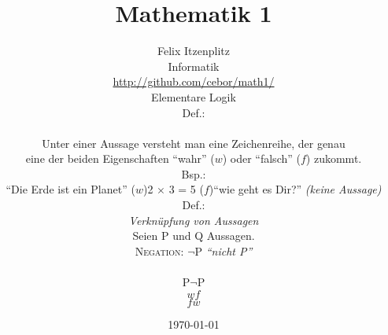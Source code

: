 \documentclass[11pt,a4paper,oneside]{article}
\begin{document}
\title{Mathematik 1}
\author{Felix Itzenplitz\\
  Informatik\\
  \url{http://github.com/cebor/math1/}
\date{\today}
\maketitle
\thispagestyle{empty}
\newpage


\section{Elementare Logik}

\paragraph{Def.:}\mbox{}\\
Unter einer Aussage versteht man eine Zeichenreihe, der genau\\
eine der beiden Eigenschaften ``wahr'' ($w$) oder ``falsch'' ($f$) zukommt.


\paragraph{Bsp.:}

\begin{itemize}
  \item ``Die Erde ist ein Planet'' ($w$)
  \item 2 $\times$ 3 = 5 ($f$)
  \item ``wie geht es Dir?'' \emph{(keine Aussage)}
\end{itemize}


\paragraph{Def.:}\emph{Verknüpfung von Aussagen}\\
Seien P und Q Aussagen.

\begin{enumerate}
  \item \textsc{Negation:} $\neg$P \emph{``nicht P''}\\[5pt]
    \begin{tabular}{ c | c }
      P & $\neg$P \\
      \hline
      $w$ & $f$ \\
      $f$ & $w$ \\
    \end{tabular}


\end{enumerate}}
\end{document}
